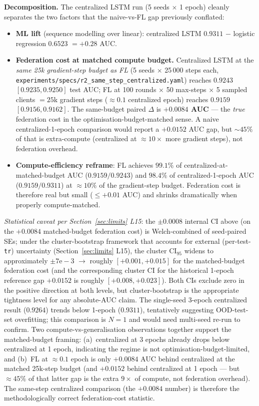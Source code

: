 \documentclass[journal]{IEEEtran}
\begin{document}
\textbf{Decomposition.} The centralized LSTM run (5 seeds $\times$ 1 epoch) cleanly separates the two factors that the naive-vs-FL gap previously conflated:
\begin{itemize}
  \item \textbf{ML lift} (sequence modelling over linear): centralized LSTM $0.9311$ $-$ logistic regression $0.6523$ $= \mathbf{+0.28}$ AUC.
  \item \textbf{Federation cost at matched compute budget.} Centralized LSTM at the \emph{same 25k gradient-step budget as FL} (5 seeds $\times$ 25\,000 steps each, \lstinline|experiments/specs/r2_same_step_centralized.yaml|) reaches \textbf{$0.9243$ $[0.9235, 0.9250]$} test AUC; FL at 100 rounds $\times$ 50 max-steps $\times$ 5 sampled clients $= 25$k gradient steps ($\approx 0.1$ centralized epoch) reaches \textbf{$0.9159$ $[0.9156, 0.9162]$}. The same-budget paired $\Delta$ is \textbf{$+0.0084$ AUC} --- the \emph{true} federation cost in the optimisation-budget-matched sense. A naive centralized-1-epoch comparison would report a $+0.0152$ AUC gap, but $\sim 45\%$ of that is extra-compute (centralized at $\approx 10\times$ more gradient steps), not federation overhead.
  \item \textbf{Compute-efficiency reframe}: FL achieves $99.1\%$ of centralized-at-matched-budget AUC ($0.9159 / 0.9243$) and $98.4\%$ of centralized-1-epoch AUC ($0.9159 / 0.9311$) at $\approx 10\%$ of the gradient-step budget. Federation cost is therefore real but small ($\leq +0.01$ AUC) and shrinks dramatically when properly compute-matched.
\end{itemize}

\textit{Statistical caveat per Section~\ref{sec:limits} L15}: the $\pm 0.0008$ internal CI above (on the $+0.0084$ matched-budget federation cost) is Welch-combined of seed-paired SEs; under the cluster-bootstrap framework that accounts for external (per-test-\lstinline|tr|) uncertainty (Section~\ref{sec:limits} L15), the cluster CI$_{95}$ widens to approximately $\pm 7\mathrm{e}{-}3$ $\rightarrow$ roughly $[+0.001, +0.015]$ for the matched-budget federation cost (and the corresponding cluster CI for the historical 1-epoch reference gap $+0.0152$ is roughly $[+0.008, +0.023]$). Both CIs exclude zero in the positive direction at both levels, but cluster-bootstrap is the appropriate tightness level for any absolute-AUC claim. The single-seed 3-epoch centralized result ($0.9264$) trends below 1-epoch ($0.9311$), tentatively suggesting OOD-test-set overfitting; this comparison is $N=1$ and would need multi-seed re-run to confirm. Two compute-vs-generalisation observations together support the matched-budget framing: (a)~centralized at 3 epochs already drops below centralized at 1 epoch, indicating the regime is not optimisation-budget-limited, and (b)~FL at $\approx 0.1$ epoch is only $+0.0084$ AUC behind centralized at the matched 25k-step budget (and $+0.0152$ behind centralized at 1 epoch --- but $\approx 45\%$ of that latter gap is the extra $9\times$ of compute, not federation overhead). The same-step centralized comparison (the $+0.0084$ number) is therefore the methodologically correct federation-cost statistic.
\end{document}
